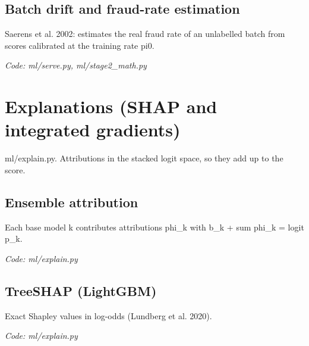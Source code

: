 \documentclass[11pt,a4paper]{article}
\newcommand{\where}[1]{\par{\small\itshape\color{mute}Code: #1}\par}
\begin{document}
\subsection*{Batch drift and fraud-rate estimation}
\par\smallskip\noindent{}\par\smallskip
\par\smallskip\noindent{}\par\smallskip
Saerens et al. 2002: estimates the real fraud rate of an unlabelled batch from scores calibrated at the training rate pi0.
\where{ml/serve.py, ml/stage2\_math.py}

\clearpage
\section{Explanations (SHAP and integrated gradients)}
{\color{mute}ml/explain.py. Attributions in the stacked logit space, so they add up to the score.}

\subsection*{Ensemble attribution}
\par\smallskip\noindent{}\par\smallskip
Each base model k contributes attributions phi\_k with b\_k + sum phi\_k = logit p\_k.
\where{ml/explain.py}

\subsection*{TreeSHAP (LightGBM)}
\par\smallskip\noindent{}\par\smallskip
Exact Shapley values in log-odds (Lundberg et al. 2020).
\where{ml/explain.py}
\end{document}
